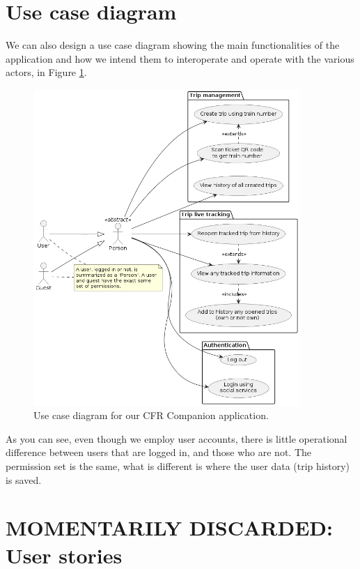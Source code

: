 \section{Use case diagram}

We can also design a use case diagram showing the main functionalities of the application and how we intend them to interoperate and operate with the various actors, in Figure \ref{FigUseCase}.

\begin{figure}[htbp]
    \centering
    \includegraphics[width=0.9\textwidth]{./figures/ch3_use-case.png}
    \caption{Use case diagram for our CFR Companion application.}
    \label{FigUseCase}
\end{figure}

As you can see, even though we employ user accounts, there is little operational difference between users that are logged in, and those who are not. The permission set is the same, what is different is where the user data (trip history) is saved.

\iffalse
    \section{MOMENTARILY DISCARDED: User stories}

